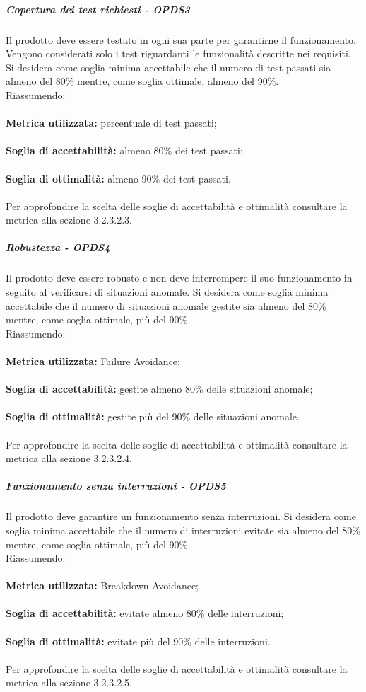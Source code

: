 \documentclass[PianoDiQualifica.tex]{subfiles}
\begin{document}
				\subparagraph{Copertura dei test richiesti - OPDS3}
				Il prodotto deve essere testato in ogni sua parte per garantirne il funzionamento. Vengono considerati solo i test riguardanti le funzionalità descritte nei requisiti.
				Si desidera come soglia minima accettabile che il numero di test passati sia almeno del 80\% mentre, come soglia ottimale, almeno del 90\%. \\
				Riassumendo: \\ \\
				\textbf{Metrica utilizzata:} percentuale di test passati;\\ \\
				\textbf{Soglia di accettabilità:} almeno 80\% dei test passati; \\ \\
				\textbf{Soglia di ottimalità:} almeno 90\% dei test passati. \\ \\
				Per approfondire la scelta delle soglie di accettabilità e ottimalità consultare la metrica alla sezione 3.2.3.2.3.
				
				\subparagraph{Robustezza - OPDS4}
				Il prodotto deve essere robusto e non deve interrompere il suo funzionamento in seguito al verificarsi di situazioni anomale.
				Si desidera come soglia minima accettabile che il numero di situazioni anomale gestite sia almeno del 80\% mentre, come soglia ottimale, più del 90\%. \\
				Riassumendo: \\ \\
				\textbf{Metrica utilizzata:} Failure Avoidance;\\ \\
				\textbf{Soglia di accettabilità:} gestite almeno 80\% delle situazioni anomale; \\ \\
				\textbf{Soglia di ottimalità:} gestite più del 90\% delle situazioni anomale. \\ \\
				Per approfondire la scelta delle soglie di accettabilità e ottimalità consultare la metrica alla sezione 3.2.3.2.4.
				
				\subparagraph{Funzionamento senza interruzioni - OPDS5}
				Il prodotto deve garantire un funzionamento senza interruzioni.
				Si desidera come soglia minima accettabile che il numero di interruzioni evitate sia almeno del 80\% mentre, come soglia ottimale, più del 90\%. \\
				Riassumendo: \\ \\
				\textbf{Metrica utilizzata:} Breakdown Avoidance;\\ \\
				\textbf{Soglia di accettabilità:} evitate almeno 80\% delle interruzioni; \\ \\
				\textbf{Soglia di ottimalità:} evitate più del 90\% delle interruzioni. \\ \\
				Per approfondire la scelta delle soglie di accettabilità e ottimalità consultare la metrica alla sezione 3.2.3.2.5.
				
\end{document}

